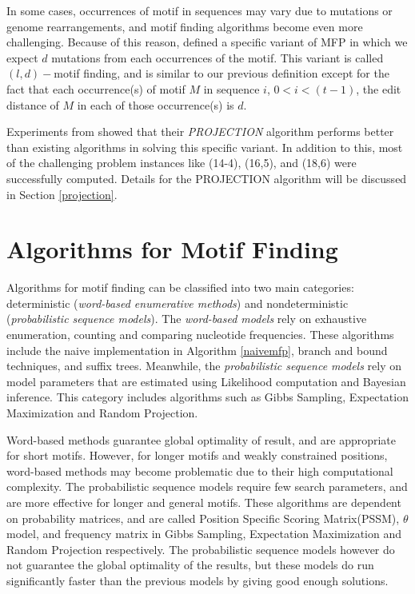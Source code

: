 \documentclass{llncs}
\begin{document}
{In some cases, occurrences of motif in sequences may vary due to mutations or genome rearrangements, and  motif finding algorithms become even more challenging. Because of this reason, \cite{pevznerBook} defined a specific variant of MFP in which we expect $d$ mutations from each occurrences of the motif. This variant is called $(l,d)-$motif finding, and is similar to our previous definition except for the fact that each occurrence(s) of motif $M$ in sequence $i$, $0<i<(t-1)$, the edit distance of $M$ in each of those occurrence(s) is $d$. 


Experiments from \cite{tompa} showed that their \textit{PROJECTION} algorithm performs better than existing algorithms in solving this specific variant. In addition to this, most of the challenging problem instances like (14-4), (16,5), and (18,6)  were successfully computed. Details for the PROJECTION algorithm will be discussed in Section \ref{projection}.

\section{Algorithms for Motif Finding}\label{mfp_algorithms}
Algorithms for motif finding can be classified into two main categories: deterministic (\textit{word-based enumerative methods}) and nondeterministic (\textit{probabilistic sequence models}). The \textit{word-based models}  rely on exhaustive enumeration, counting and comparing nucleotide frequencies. These algorithms include the naive implementation in Algorithm \ref{naivemfp}, branch and bound techniques, and suffix trees. Meanwhile, the \textit{probabilistic sequence models} rely on model parameters that are estimated using Likelihood computation and Bayesian inference. This category includes algorithms such as Gibbs Sampling\cite{yu}, Expectation Maximization\cite{liu} and Random Projection\cite{tompa}.

Word-based methods guarantee global optimality of result, and are appropriate for short motifs. However, for longer motifs and weakly constrained positions, word-based methods may become problematic due to their high computational complexity. The probabilistic sequence models require few search parameters, and are more effective for longer and general motifs. These algorithms are  dependent on probability matrices, and are called  Position Specific Scoring Matrix(PSSM), $\theta$ model, and frequency matrix in Gibbs Sampling, Expectation Maximization and Random Projection respectively. The probabilistic sequence models however do not guarantee the global optimality of the results, but these models do run significantly faster than the previous models by giving good enough solutions. 


}
\end{document}
